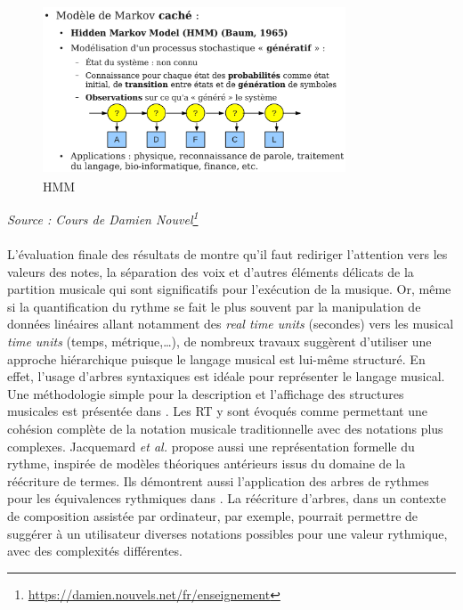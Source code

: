 \begin{figure}[h]
	\centering
	\includegraphics[height=50mm, width=90mm]{z_images/2_etat_de_l_art/0_hmm.png}
	\caption{HMM}
\end{figure}
\textit{Source : Cours de Damien Nouvel\footnote{\url{https://damien.nouvels.net/fr/enseignement}}}\\\\

L’évaluation finale des résultats de \cite{SHIBATA2021262} montre qu’il faut rediriger l’attention vers les valeurs des notes, la séparation des voix et d'autres éléments délicats de la partition musicale qui sont significatifs pour l'exécution de la musique. 
Or, même si la quantification du rythme se fait le plus souvent par la manipulation de données linéaires allant notamment des \textit{real time units} (secondes) vers les musical \textit{time units} (temps, métrique,…), de nombreux travaux suggèrent d’utiliser une approche hiérarchique puisque le langage musical est lui-même structuré.
%
%
En effet, l’usage d’arbres syntaxiques est idéale pour représenter le langage musical. 
Une méthodologie simple pour la description et l'affichage des structures musicales est présentée dans \cite{rythm_tree}. 
Les RT 
y sont évoqués comme permettant une cohésion complète de la notation musicale traditionnelle avec des notations plus complexes. Jacquemard \textit{et al.} 
\cite{jacquemard:hal-01134096} propose aussi une représentation formelle du rythme, 
inspirée de modèles théoriques antérieurs issus du domaine de la réécriture de termes. 
Ils démontrent aussi l’application des arbres de rythmes pour 
les équivalences rythmiques dans \cite{jacquemard:hal-01403982}. 
La réécriture d’arbres, dans un contexte de composition assistée par ordinateur, 
par exemple, pourrait permettre de suggérer à un utilisateur diverses notations possibles pour une valeur rythmique, avec des complexités différentes.

